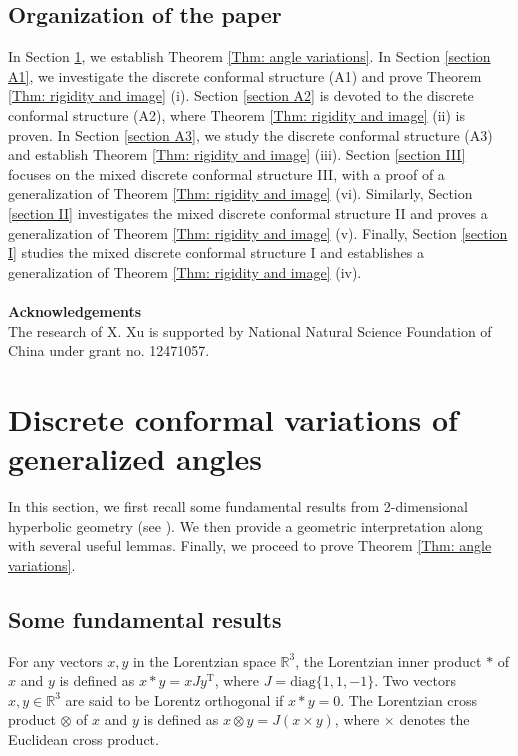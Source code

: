 \documentclass[12pt]{amsart}
\theoremstyle{definition}
\begin{document}
\subsection{Organization of the paper}

In Section \ref{section 2}, we establish Theorem \ref{Thm: angle variations}. 
In Section \ref{section A1}, we investigate the discrete conformal structure (A1) and prove Theorem \ref{Thm: rigidity and image} (i). 
Section \ref{section A2} is devoted to the discrete conformal structure (A2), where Theorem \ref{Thm: rigidity and image} (ii) is proven. 
In Section \ref{section A3}, we study the discrete conformal structure (A3) and establish Theorem \ref{Thm: rigidity and image} (iii). 
Section \ref{section III} focuses on the mixed discrete conformal structure III, with a proof of a generalization of Theorem \ref{Thm: rigidity and image} (vi). 
Similarly, Section \ref{section II} investigates the mixed discrete conformal structure II and proves a generalization of Theorem \ref{Thm: rigidity and image} (v). 
Finally, Section \ref{section I} studies the mixed discrete conformal structure I and establishes a generalization of Theorem \ref{Thm: rigidity and image} (iv).
\\
\\
\textbf{Acknowledgements}\\[8pt]
The research of X. Xu is supported by National Natural Science Foundation of China under grant no. 12471057.

\section{Discrete conformal variations of generalized angles}\label{section 2}

In this section, we first recall some fundamental results from 2-dimensional hyperbolic geometry (see \cite[Chapters 3 and 6]{Ratcliffe}). 
We then provide a geometric interpretation along with several useful lemmas. 
Finally, we proceed to prove Theorem \ref{Thm: angle variations}.

\subsection{Some fundamental results}

For any vectors $x,y$ in the Lorentzian space $\mathbb{R}^3$,
the Lorentzian inner product $*$ of $x$ and $y$ is defined as $x*y=xJy^\mathrm{T}$,
where $J=\mathrm{diag} \{1,1, -1\}$.
Two vectors $x,y\in \mathbb{R}^3$ are said to be Lorentz orthogonal if $x*y=0$.
The Lorentzian cross product $\otimes$ of $x$ and $y$ is defined as $x\otimes y=J(x\times y)$,
where $\times$ denotes the Euclidean cross product.
\end{document}
